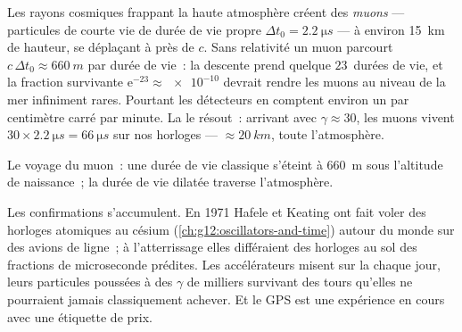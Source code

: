 \begin{example}\label{ex:g12:special-relativity:muons}
Les rayons cosmiques frappant la haute atmosphère créent des
\emph{muons} --- particules de courte vie de durée de vie propre
$\Delta t_0 = \qty{2.2}{\micro s}$ --- à environ \qty{15}{km} de
hauteur, se déplaçant à près de $c$. Sans relativité un muon parcourt
$c\,\Delta t_0 \approx \qty{660}{m}$ par durée de vie~: la descente
prend quelque $23$~durées de vie, et la fraction survivante
$\mathrm{e}^{-23} \approx \num{e-10}$ devrait rendre les muons au
niveau de la mer infiniment rares. Pourtant les détecteurs en comptent
environ un par centimètre carré par minute. La
 le résout~: arrivant avec
$\gamma \approx 30$, les muons vivent $30 \times \qty{2.2}{\micro s}
= \qty{66}{\micro s}$ sur nos horloges ---
 $\approx \qty{20}{km}$, toute l'atmosphère.
\end{example}

\begin{omfigure}

{\small Le voyage du muon~: une durée de vie classique s'éteint à
\qty{660}{m} sous l'altitude de naissance~; la durée de vie dilatée
traverse l'atmosphère.}
\end{omfigure}

Les confirmations s'accumulent. En 1971 Hafele et Keating ont fait
voler des horloges atomiques au césium (\cref{ch:g12:oscillators-and-time})
autour du monde sur des avions de ligne~; à l'atterrissage elles
différaient des horloges au sol des fractions de microseconde
prédites. Les accélérateurs misent sur la  chaque jour,
leurs particules poussées à des $\gamma$ de milliers survivant des
tours qu'elles ne pourraient jamais classiquement achever. Et le GPS
est une expérience en cours avec une étiquette de prix.

